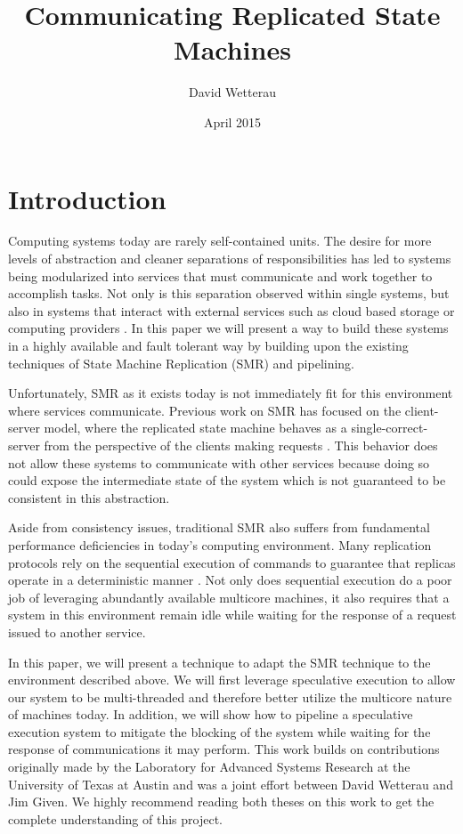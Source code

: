 \documentclass[11pt, oneside]{report}
\title{Communicating Replicated State Machines}
\author{David Wetterau}
\date{April 2015}
\begin{document}
\maketitle

\tableofcontents

\chapter{Introduction}\label{Introduction}
Computing systems today are rarely self-contained units. 
The desire for more levels of abstraction and cleaner separations of responsibilities has led to systems being modularized into services that must communicate and work together to accomplish tasks. 
Not only is this separation observed within single systems, but also in systems that interact with external services such as cloud based storage or computing providers \cite{tao, spanner, dynamo}. 
In this paper we will present a way to build these systems in a highly available and fault tolerant way by building upon the existing techniques of State Machine Replication (SMR) and pipelining.

Unfortunately, SMR as it exists today is not immediately fit for this environment where services communicate. 
Previous work on SMR has focused on the client-server model, where the replicated state machine behaves as a single-correct-server from the perspective of the clients making requests \cite{schneider}. 
This behavior does not allow these systems to communicate with other services because doing so could expose the intermediate state of the system which is not guaranteed to be consistent in this abstraction.

Aside from consistency issues, traditional SMR also suffers from fundamental performance deficiencies in today's computing environment. 
Many replication protocols rely on the sequential execution of commands to guarantee that replicas operate in a deterministic manner \cite{practicalBFT, upRight, hq, paxos}. 
Not only does sequential execution do a poor job of leveraging abundantly available multicore machines, it also requires that a system in this environment remain idle while waiting for the response of a request issued to another service.

In this paper, we will present a technique to adapt the SMR technique to the environment described above. 
We will first leverage speculative execution \cite{eve, zyz} to allow our system to be multi-threaded and therefore better utilize the multicore nature of machines today. 
In addition, we will show how to pipeline a speculative execution system to mitigate the blocking of the system while waiting for the response of communications it may perform. 
This work builds on contributions originally made by the Laboratory for Advanced Systems Research at the University of Texas at Austin and was a joint effort between David Wetterau and Jim Given. 
We highly recommend reading both theses on this work to get the complete understanding of this project.
\end{document}
